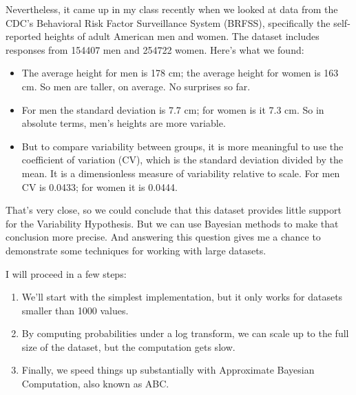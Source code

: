\documentclass[12pt]{book}
\begin{document}
Nevertheless, it came up in my class recently when we looked at data
from the CDC's Behavioral Risk Factor Surveillance System (BRFSS),
specifically the self-reported heights of adult American men and women.
The dataset includes responses from 154407 men and 254722 women.
Here's what we found:

\begin{itemize}

\item The average height for men is 178 cm; the average height for
  women is 163 cm.  So men are taller, on average.  No surprises so
  far.

\item For men the standard deviation is 7.7 cm; for women is it 7.3
  cm.  So in absolute terms, men's heights are more variable.

\item But to compare variability between groups, it is more meaningful
  to use the coefficient of variation (CV), which is the standard
  deviation divided by the mean.  It is a dimensionless measure of
  variability relative to scale.  For men CV is 0.0433; for women it
  is 0.0444.

\end{itemize}

That's very close, so we could conclude that this dataset provides
little support for the Variability Hypothesis.  But we can use
Bayesian methods to make that conclusion more precise.  And answering
this question gives me a chance to demonstrate some techniques
for working with large datasets.

I will proceed in a few steps:

\begin{enumerate}

\item We'll start with the simplest implementation, but it only works
  for datasets smaller than 1000 values.

\item By computing probabilities under a log transform, we can scale
  up to the full size of the dataset, but the computation gets slow.

\item Finally, we speed things up substantially with Approximate
  Bayesian Computation, also known as ABC.

\end{enumerate}
\end{document}
